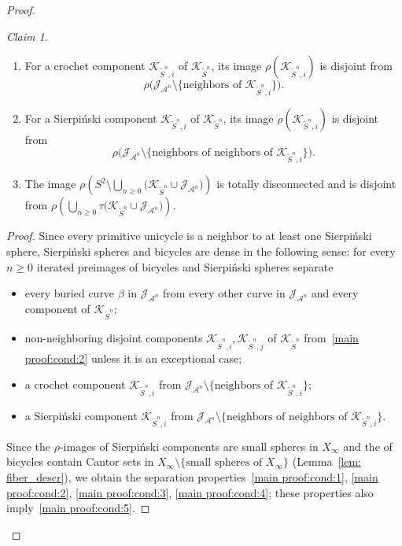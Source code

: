 \documentclass{amsart}
\theoremstyle{plain}
\theoremstyle{definition}
\theoremstyle{remark}
\newtheorem*{claim}{Claim}
\renewcommand{\AA}{{\mathcal A}}
\newcommand{\filled}{{\mathcal K}}
\newcommand{\Jul}{{\mathcal J}}
\begin{document}
\begin{proof}
\begin{claim}
\begin{enumerate}[label=\text{(\arabic*)},font=\normalfont,leftmargin=*]
\item\label{main proof:cond:3} For a crochet component $\filled_{\widetilde S^n, i}$ of $\filled_{\widetilde S^n}$, its image $\rho(\filled_{\widetilde S^n, i})$ is disjoint from
\[ \rho\big(\Jul_{\AA^n}\setminus \{\text{neighbors of $\filled_{\widetilde S^n,i}$}\}\big).\]
\item\label{main proof:cond:4} For a Sierpi\'{n}ski  component $\filled_{\widetilde S^n, i}$ of $\filled_{\widetilde S^n}$, its image $\rho(\filled_{\widetilde S^n, i})$ is disjoint from
\[ \rho\big(\Jul_{\AA^n}\setminus \{\text{neighbors of neighbors of $\filled_{\widetilde S^n,i}$}\}\big).\]

\item\label{main proof:cond:5} The image $\displaystyle \rho \left(S^2\setminus \bigcup_{n\ge 0}  \big(\filled_{\widetilde S^n} \cup \Jul_{\AA^n}\big) \right)$ is totally disconnected and is disjoint from $\displaystyle \rho \left( \bigcup_{n\ge 0}  \tau\big(\filled_{\widetilde S^n} \cup \Jul_{\AA^n}\big) \right)$.
 \end{enumerate}
\end{claim}


\begin{proof}
Since every primitive unicycle is a neighbor to at least one Sierpi\'{n}ski sphere, Sierpi\'{n}ski spheres and bicycles are dense in the following sense: for every $n\ge 0$ iterated preimages of bicycles and Sierpi\'{n}ski spheres separate 
\begin{itemize}
\item every buried curve $\beta$ in $\Jul_{\AA^n}$ from every other curve in $\Jul_{\AA^n}$ and every component of $\filled_{\widetilde S^n}$;
\item non-neighboring disjoint components $\filled_{\widetilde S^n, i},\filled_{\widetilde S^n, j}$ of $\filled_{\widetilde S^n}$ from~\ref{main proof:cond:2} unless it is an exceptional case;
\item a crochet component $\filled_{\widetilde S^n, i}$ from $\Jul_{\AA^n}\setminus \{\text{neighbors of $\filled_{\widetilde S^n,i}$}\}$;
\item a Sierpi\'{n}ski  component $\filled_{\widetilde S^n, i}$ from $\Jul_{\AA^n}\setminus \{\text{neighbors of neighbors of $\filled_{\widetilde S^n,i}$}\}$.
\end{itemize}
Since the $\rho$-images of Sierpi\'{n}ski  components are small spheres in $X_\infty$ and the  of bicycles contain Cantor sets in $X_\infty\setminus \{\text{small spheres of }X_\infty\}$ (Lemma~\ref{lem: fiber_descr}), we obtain the separation properties~\ref{main proof:cond:1}, \ref{main proof:cond:2}, \ref{main proof:cond:3}, \ref{main proof:cond:4}; these properties also imply~\ref{main proof:cond:5}.
\end{proof} 
 \end{proof} 
\end{document}
